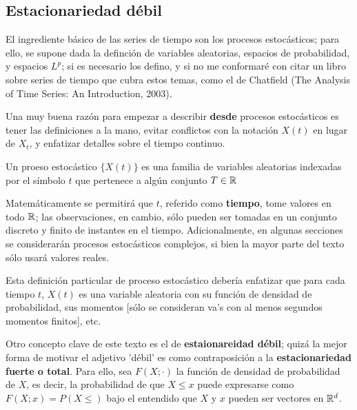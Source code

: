 


\subsection{Estacionariedad d\'ebil}

El ingrediente b\'asico de las series de tiempo son los procesos estoc\'asticos; para ello, se
supone dada la definci\'on de variables aleatorias, espacios de probabilidad, y espacios $L^{p}$;
si es necesario los defino, y si no me conformar\'e con citar un libro sobre series de tiempo
que cubra estos temas,
como el de Chatfield (The Analysis of Time Series: An Introduction, 2003).

Una muy buena raz\'on para empezar a describir \textbf{desde} procesos estoc\'asticos es tener
las definiciones a la mano, evitar conflictos con la notaci\'on $X(t)$ en lugar de $X_t$, y
enfatizar detalles sobre el tiempo continuo.

\begin{defn}
Un proeso estoc\'astico $\{ X(t) \}$ es una familia de variables aleatorias indexadas por el 
s\'imbolo $t$ que pertenece a alg\'un conjunto $T \in \mathbb{R}$
\end{defn}

Matem\'aticamente se permitir\'a que $t$, referido como \textbf{tiempo}, tome valores 
en todo $\mathbb{R}$; las observaciones, en cambio,
s\'olo pueden ser tomadas en un conjunto discreto y finito de instantes en el tiempo. 
Adicionalmente, en algunas secciones se considerar\'an procesos estoc\'asticos complejos,
si bien la mayor parte del texto s\'olo usar\'a valores reales.

Esta definici\'on particular de proceso estoc\'astico deber\'ia enfatizar que para cada 
tiempo $t$, $X(t)$ es una variable aleatoria con su funci\'on de densidad de probabilidad,
sus momentos [s\'olo se consideran va's con al menos segundos momentos finitos], etc.

Otro concepto clave de este texto es el de \textbf{estaionareidad d\'ebil}; 
quiz\'a la mejor forma de motivar el adjetivo 'd\'ebil' es como contraposici\'on a 
la \textbf{estacionariedad fuerte o total}. 
Para ello, sea $F(X;\cdot)$ la funci\'on de densidad de probabilidad de $X$, es decir, 
la probabilidad de que $X\leq x$ puede expresarse como 
$
F(X;x) = P(X\leq)
$
bajo el entendido que $X$ y $x$ pueden ser vectores en $\mathbb{R}^{d}$.

